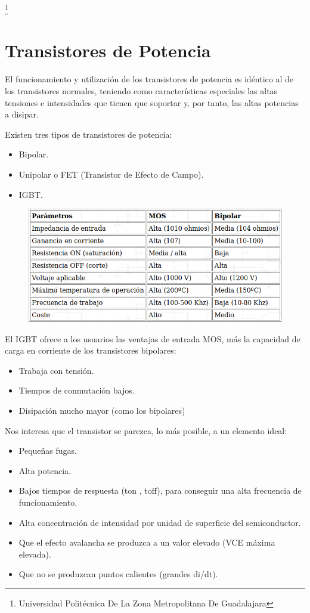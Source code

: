 \documentclass[11pt,a4paper]{article}
\begin{document}
\footnote{Universidad Politécnica De La Zona Metropolitana De Guadalajara} 

\newpage

\section{Transistores de Potencia}

El funcionamiento y utilización de los transistores de potencia es idéntico al de los transistores normales, teniendo como características especiales las altas tensiones e intensidades que tienen que soportar y, por tanto, las altas potencias a disipar.

Existen tres tipos de transistores de potencia:
\begin{itemize}
\item Bipolar.
\item Unipolar o FET (Transistor de Efecto de Campo).
\item IGBT.
\end{itemize}

\begin{figure}[hbtp]
\centering
\includegraphics[scale=0.80]{1.png}
\end{figure}
El IGBT ofrece a los usuarios las ventajas de entrada MOS, más la capacidad de carga en corriente de los transistores bipolares: 
\begin{itemize}
\item Trabaja con tensión.
\item Tiempos de conmutación bajos.
\item Disipación mucho mayor (como los bipolares)
\end{itemize}

Nos interesa que el transistor se parezca, lo más posible, a un elemento ideal: 

\begin{itemize}

\item Pequeñas fugas.
\item Alta potencia.
\item Bajos tiempos de respuesta (ton , toff), para conseguir una alta frecuencia de funcionamiento.
\item Alta concentración de intensidad por unidad de superficie del semiconductor.
\item Que el efecto avalancha se produzca a un valor elevado (VCE máxima elevada).
\item Que no se produzcan puntos calientes (grandes di/dt).

\end{itemize}
\end{document}
